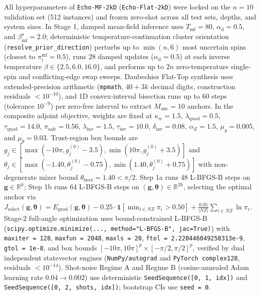 \documentclass[10pt,a4paper]{article}
\begin{document}
All hyperparameters of \texttt{Echo-MF-2kD} (\texttt{Echo-Flat-2kD}) were locked on the $n = 10$ validation set (512 instances) and frozen zero-shot across all test sets, depths, and system sizes. In Stage 1, damped mean-field inference uses $T_{\mathrm{mf}} = 80$, $\alpha_{\mathrm{d}} = 0.5$, and $\beta_{\mathrm{mf}}^\star = 2.0$; deterministic temperature-continuation cluster orientation (\texttt{resolve\_\allowbreak{}prior\_\allowbreak{}direction}) perturbs up to $\min(n, 6)$ most uncertain spins (closest to $\pi_i^{\mathrm{mf}} = 0.5$), runs 28 damped updates ($\alpha_{\mathrm{d}} = 0.5$) at each inverse temperature $\beta \in \{2.5, 6.0, 16.0\}$, and performs up to $2n$ zero-temperature single-spin and conflicting-edge swap sweeps. Daubechies Flat-Top synthesis uses extended-precision arithmetic (\texttt{mpmath}, $40 + 3k$ decimal digits, construction residuals $< 10^{-10}$), and 1D convex-interval bisection runs up to 60 steps (tolerance $10^{-9}$) per zero-free interval to extract $M_{\mathrm{anc}} = 10$ anchors. In the composite adjoint objective, weights are fixed at $\kappa_w = 1.5$, $\lambda_{\mathrm{quad}} = 0.5$, $\tau_{\mathrm{quad}} = 14.0$, $\pi_{\mathrm{safe}} = 0.56$, $\lambda_{\mathrm{inv}} = 1.5$, $\tau_{\mathrm{inv}} = 10.0$, $\delta_{\mathrm{inv}} = 0.08$, $\alpha_E = 1.5$, $\mu_g = 0.005$, and $\mu_\theta = 0.03$. Trust-region box bounds are $g_j \in [\max(-10\pi, g_j^{(0)} - 3.5), \min(10\pi, g_j^{(0)} + 3.5)]$ and $\theta_j \in [\max(-1.40, \theta_j^{(0)} - 0.75), \min(1.40, \theta_j^{(0)} + 0.75)]$ with non-degenerate mixer bound $\theta_{\max} = 1.40 < \pi/2$. Step 1a runs 48 L-BFGS-B steps on $\boldsymbol{g} \in \mathbb{R}^k$; Step 1b runs 64 L-BFGS-B steps on $(\boldsymbol{g}, \boldsymbol{\theta}) \in \mathbb{R}^{2k}$, selecting the optimal anchor via $J_{\mathrm{select}}(\boldsymbol{g}, \boldsymbol{\theta}) = E_{\mathrm{prod}}(\boldsymbol{g}, \boldsymbol{\theta}) - 0.25 \cdot \mathbf{1}[\min_{i \in NZ}\pi_i > 0.50] + \frac{0.05}{|NZ|}\sum_{i \in NZ}\ln\pi_i$. Stage-2 full-angle optimization uses bound-constrained L-BFGS-B \citep{byrd1995limited} (\texttt{scipy.optimize.minimize(...,\allowbreak\ method="L-BFGS-B",\allowbreak\ jac=True)}) with \texttt{maxiter = 128}, \texttt{maxfun = 2048}, \texttt{maxls = 20}, \texttt{ftol = 2.220446049250313e-9}, \texttt{gtol = 1e-8}, and box bounds $[-10\pi, 10\pi]^p \times [-\pi/2, \pi/2]^p$, verified by dual independent statevector engines (\texttt{NumPy/autograd} and \texttt{PyTorch complex128}, residuals $< 10^{-14}$). Shot-noise Regime A and Regime B (cosine-annealed Adam learning rate $0.04 \to 0.002$) use deterministic \texttt{SeedSequence([0,\allowbreak\ 1,\allowbreak\ idx])} and \texttt{SeedSequence([0,\allowbreak\ 2,\allowbreak\ shots,\allowbreak\ idx])}; bootstrap CIs use \texttt{seed = 0}.
\end{document}
